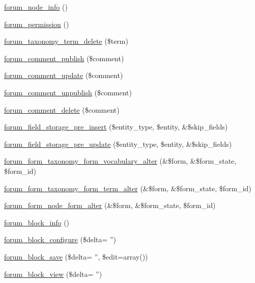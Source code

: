 \begin{DoxyCompactItemize}
\item 
\hyperlink{forum_8module_a6d1c8250830c247bcecf8950ab52c34e}{forum\_\-node\_\-info} ()
\item 
\hyperlink{forum_8module_a804aa1e2b5a5ab5c05524c9289cc9a9e}{forum\_\-permission} ()
\item 
\hyperlink{forum_8module_a4fa90e2df492cc84662faa0f2742fa71}{forum\_\-taxonomy\_\-term\_\-delete} (\$term)
\item 
\hyperlink{forum_8module_ae3fb23a337e109f966fdebf7e4453aaa}{forum\_\-comment\_\-publish} (\$comment)
\item 
\hyperlink{forum_8module_a9208eaf8d6370b602b9f4e11e3ed4e27}{forum\_\-comment\_\-update} (\$comment)
\item 
\hyperlink{forum_8module_a11843a3a30fb748c618574333f6dd76d}{forum\_\-comment\_\-unpublish} (\$comment)
\item 
\hyperlink{forum_8module_a7c2baba0a86b56c79a8a90d79f6155e2}{forum\_\-comment\_\-delete} (\$comment)
\item 
\hyperlink{forum_8module_abafaf758d9a36d98c276125631c304ae}{forum\_\-field\_\-storage\_\-pre\_\-insert} (\$entity\_\-type, \$entity, \&\$skip\_\-fields)
\item 
\hyperlink{forum_8module_afac99913c3649631f36b8200bd3ee2b2}{forum\_\-field\_\-storage\_\-pre\_\-update} (\$entity\_\-type, \$entity, \&\$skip\_\-fields)
\item 
\hyperlink{forum_8module_a3702bf881db6198891a4e019ab7b7ffe}{forum\_\-form\_\-taxonomy\_\-form\_\-vocabulary\_\-alter} (\&\$form, \&\$form\_\-state, \$form\_\-id)
\item 
\hyperlink{forum_8module_addd3b3920f58d59384aa5040f9ba72a4}{forum\_\-form\_\-taxonomy\_\-form\_\-term\_\-alter} (\&\$form, \&\$form\_\-state, \$form\_\-id)
\item 
\hyperlink{forum_8module_af43bc6e1b64952a66ed3662f1d8c470e}{forum\_\-form\_\-node\_\-form\_\-alter} (\&\$form, \&\$form\_\-state, \$form\_\-id)
\item 
\hyperlink{forum_8module_a33c02440dca314b244864b9b4f0a3a37}{forum\_\-block\_\-info} ()
\item 
\hyperlink{forum_8module_a4b4c684609a29d037480504be38c3ab6}{forum\_\-block\_\-configure} (\$delta= '')
\item 
\hyperlink{forum_8module_a5b34b26f6b5fdba97924e6533310445c}{forum\_\-block\_\-save} (\$delta= '', \$edit=array())
\item 
\hyperlink{forum_8module_ab6b1e6be188dacf620ab5ece0861a2ac}{forum\_\-block\_\-view} (\$delta= '')

\end{DoxyCompactItemize}
